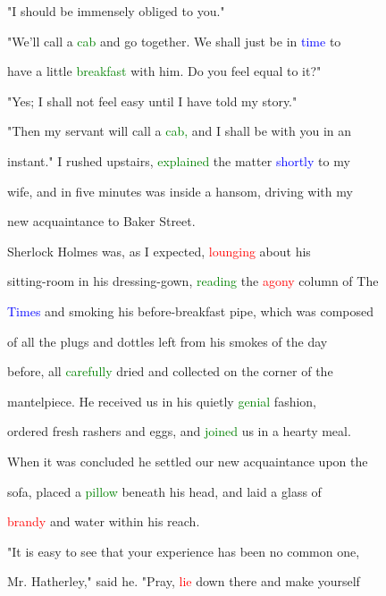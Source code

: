  "I should be immensely \textcolor{BurntOrange}{obliged} to you."



 "We'll call a \textcolor{green}{cab} and go together. We shall just be in \textcolor{blue}{time} to

 have a little \textcolor{green}{breakfast} with him. Do you feel equal to it?"



 "Yes; I shall not feel easy until I have told my story."



 "Then my \textcolor{BurntOrange}{servant} will call a \textcolor{green}{cab,} and I shall be with you in an

 instant." I rushed upstairs, \textcolor{green}{explained} the matter \textcolor{blue}{shortly} to my

 wife, and in five minutes was inside a hansom, driving with my

 new acquaintance to Baker Street.



 Sherlock Holmes was, as I \textcolor{BurntOrange}{expected,} \textcolor{red}{lounging} about his

 sitting-room in his dressing-gown, \textcolor{green}{reading} the \textcolor{red}{agony} column of The

 \textcolor{blue}{Times} and smoking his before-breakfast pipe, which was composed

 of all the plugs and dottles left from his smokes of the day

 before, all \textcolor{green}{carefully} dried and collected on the corner of the

 mantelpiece. He received us in his quietly \textcolor{green}{genial} fashion,

 ordered fresh rashers and eggs, and \textcolor{green}{joined} us in a hearty meal.

 When it was concluded he settled our new acquaintance upon the

 sofa, placed a \textcolor{green}{pillow} beneath his head, and laid a glass of

 \textcolor{red}{brandy} and water within his reach.



 "It is easy to see that your experience has been no common one,

 Mr. Hatherley," said he. \textcolor{BurntOrange}{"Pray,} \textcolor{red}{lie} down there and make yourself


